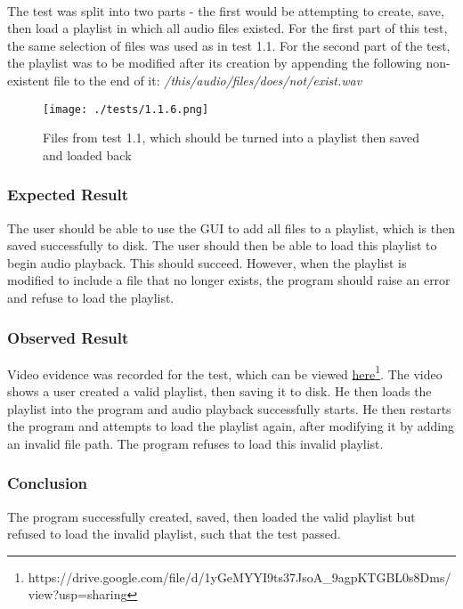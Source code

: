 \paragraph{}
The test was split into two parts - the first would be attempting to create, save, then load a playlist in which all audio files existed. For the first part of this test, the same selection of files was used as in test 1.1. For the second part of the test, the playlist was to be modified after its creation by appending the following non-existent file to the end of it:
\textit{/this/audio/files/does/not/exist.wav}
\begin{figure}[H]
	\texttt{[image: ./tests/1.1.6.png]}
	\caption{Files from test 1.1, which should be turned into a playlist then saved and loaded back}
\end{figure}

\subsubsection*{Expected Result}
The user should be able to use the GUI to add all files to a playlist, which is then saved successfully to disk. The user should then be able to load this playlist to begin audio playback. This should succeed. However, when the playlist is modified to include a file that no longer exists, the program should raise an error and refuse to load the playlist.

\subsubsection*{Observed Result}
\label{sec:evidence1.2}
Video evidence was recorded for the test, which can be viewed \href{https://drive.google.com/file/d/1yGeMYYI9ts37JsoA_9agpKTGBL0s8Dms/view?usp=sharing}{here}\footnote{
	https://drive.google.com/file/d/1yGeMYYI9ts37JsoA\_9agpKTGBL0s8Dms/view?usp=sharing
}.  The video shows a user created a valid playlist, then saving it to disk. He then loads the playlist into the program and audio playback successfully starts. He then restarts the program and attempts to load the playlist again, after modifying it by adding an invalid file path. The program refuses to load this invalid playlist.

\subsubsection*{Conclusion}
The program successfully created, saved, then loaded the valid playlist but refused to load the invalid playlist, such that the test passed.

